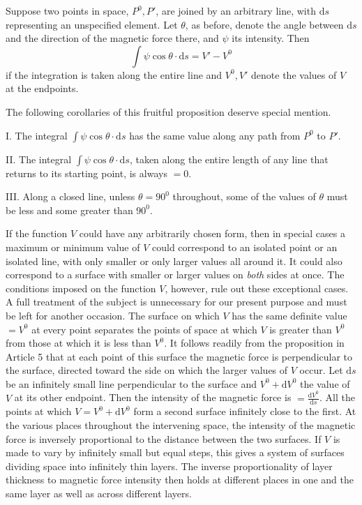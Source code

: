 Suppose two points in space, $P^0,P'$, are joined by an arbitrary line, with $\mathrm{d}s$ representing an unspecified element. Let $\theta$, as before, denote the angle between $\mathrm{d}s$ and the direction of the magnetic force there, and $\psi$ its intensity. Then
\[
\int\psi\cos\theta\cdot\mathrm{d}s=V'-V^0
\]
if the integration is taken along the entire line and $V^0,V'$ denote the values of $V$ at the endpoints.

The following corollaries of this fruitful proposition deserve special mention.

I. The integral $\int\psi\cos\theta\cdot\mathrm{d}s$ has the same value along any path from $P^0$ to $P'$.

II. The integral $\int\psi\cos\theta\cdot\mathrm{d}s$, taken along the entire length of any line that returns to its starting point, is always $=0$.

III. Along a closed line, unless $\theta=90^0$ throughout, some of the values of $\theta$ must be less and some greater than $90^0$.

\expandafter\def\csname HistoricalNoteText15\endcsname{If the function $V$ could have any arbitrarily chosen form, then in special cases a maximum or minimum value of $V$ could correspond to an isolated point or an isolated line, with only smaller or only larger values all around it. It could also correspond to a surface with smaller or larger values on \textit{both} sides at once. The conditions imposed on the function $V$, however, rule out these exceptional cases. A full treatment of the subject is unnecessary for our present purpose and must be left for another occasion.}
The surface on which $V$ has the same definite value $=V^0$ at every point separates the points of space at which $V$ is greater than $V^0$ from those at which it is less than $V^0$. It follows readily from the proposition in Article 5 that at each point of this surface the magnetic force is perpendicular to the surface, directed toward the side on which the larger values of $V$ occur. Let $\mathrm{d}s$ be an infinitely small line perpendicular to the surface and $V^0+\mathrm{d}V^0$ the value of $V$ at its other endpoint. Then the intensity of the magnetic force is $=\frac{\mathrm{d}V^0}{\mathrm{d}s}$. All the points at which $V=V^0+\mathrm{d}V^0$ form a second surface infinitely close to the first. At the various places throughout the intervening space, the intensity of the magnetic force is inversely proportional to the distance between the two surfaces. If $V$ is made to vary by infinitely small but equal steps, this gives a system of surfaces dividing space into infinitely thin layers. The inverse proportionality of layer thickness to magnetic force intensity then holds at different places in one and the same layer as well as across different layers.


